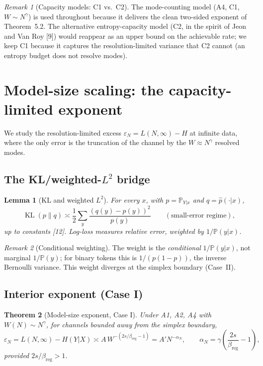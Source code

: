 \documentclass[12pt]{article}
\newcommand{\eps}{\varepsilon}
\newcommand{\KL}{\operatorname{KL}}
\newcommand{\Prob}{\mathbb{P}}
\newtheorem{theorem}{Theorem}[section]
\newtheorem{lemma}[theorem]{Lemma}
\theoremstyle{remark}
\newtheorem{remark}{Remark}
\begin{document}
\begin{remark}[Capacity models: C1 vs.\ C2]
\label{rem:capacity}
The mode-counting model (A4, C1, $W\!\sim\!N^{\gamma}$) is used throughout because
it delivers the clean two-sided exponent of Theorem~5.2. The
alternative entropy-capacity model (C2, in the spirit of
Jeon and Van Roy [9]) would reappear as an upper bound on the achievable
rate; we keep C1 because it captures the resolution-limited variance that C2
cannot (an entropy budget does not resolve modes).
\end{remark}

\section{Model-size scaling: the capacity-limited exponent}
\label{sec:modelsize}

We study the resolution-limited excess $\eps_N = L(N,\infty)-H$ at infinite
data, where the only error is the truncation of the channel by the $W\!\approx\!
N^\gamma$ resolved modes.

\subsection{The KL/weighted-$L^2$ bridge}
\begin{lemma}[KL and weighted $L^2$]
\label{lem:bridge}
For every $x$, with $p=\Prob_{Y|x}$ and $q=\hat p(\cdot|x)$,
\begin{equation}
  \KL(p\|q) \asymp \frac12 \sum_y \frac{(q(y)-p(y))^2}{p(y)}
  \qquad (\text{small-error regime}),
  \label{eq:bridge}
\end{equation}
up to constants [12].  Log-loss measures \emph{relative} error,
weighted by $1/\Prob(y|x)$.
\end{lemma}

\begin{remark}[Conditional weighting]
\label{rem:conditional}
The weight is the \emph{conditional} $1/\Prob(y|x)$, not marginal
$1/\Prob(y)$; for binary tokens this is $1/(p(1-p))$, the inverse Bernoulli
variance.  This weight diverges at the simplex boundary (Case~II).
\end{remark}

\subsection{Interior exponent (Case I)}
\begin{theorem}[Model-size exponent, Case I]
\label{thm:modelN}
Under A1, A2, A4 with $W(N)\sim N^{\gamma}$, for channels bounded away from
the simplex boundary,
\begin{equation}
  \eps_N = L(N,\infty) - H(Y|X) \asymp A\, W^{-(2s/\beta_{\mathrm{reg}}-1)}
  = A' N^{-\alpha_N},
  \qquad \alpha_N=\gamma\left(\frac{2s}{\beta_{\mathrm{reg}}}-1\right),
  \label{eq:modelN}
\end{equation}
provided $2s/\beta_{\mathrm{reg}}>1$.
\end{theorem}
\end{document}
